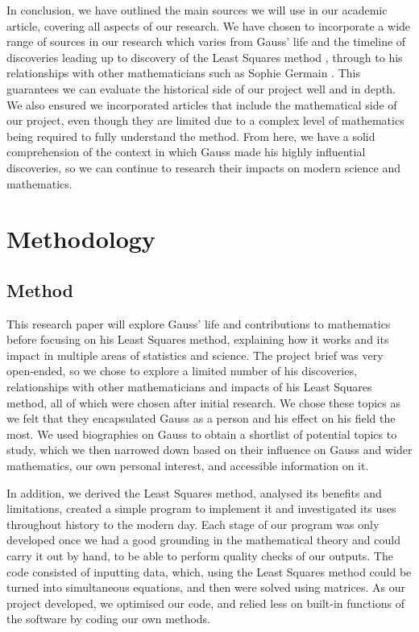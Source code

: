 \documentclass{article}
\begin{document}
In conclusion, we have outlined the main sources we will use in our academic article, covering all aspects of our research. We have chosen to incorporate a wide range of sources in our research which varies from Gauss' life and the timeline of discoveries leading up to discovery of the Least Squares method \cite{stigler}, through to his relationships with other mathematicians such as Sophie Germain \cite{germaincorrespondence}. This guarantees we can evaluate the historical side of our project well and in depth. We also ensured we incorporated articles that include the mathematical side of our project, even though they are limited due to a complex level of mathematics being required to fully understand the method. From here, we have a solid comprehension of the context in which Gauss made his highly influential discoveries, so we can continue to research their impacts on modern science and mathematics. 

\section{Methodology}
\subsection{Method}

This research paper will explore Gauss’ life and contributions to mathematics before focusing on his Least Squares method, explaining how it works and its impact in multiple areas of statistics and science. The project brief was very open-ended, so we chose to explore a limited number of his discoveries, relationships with other mathematicians and impacts of his Least Squares method, all of which were chosen after initial research. We chose these topics as we felt that they encapsulated Gauss as a person and his effect on his field the most. We used biographies on Gauss to obtain a shortlist of potential topics to study, which we then narrowed down based on their influence on Gauss and wider mathematics, our own personal interest, and accessible information on it.  

In addition, we derived the Least Squares method, analysed its benefits and limitations, created a simple program to implement it and investigated its uses throughout history to the modern day. Each stage of our program was only developed once we had a good grounding in the mathematical theory and could carry it out by hand, to be able to perform quality checks of our outputs. The code consisted of inputting data, which, using the Least Squares method could be turned into simultaneous equations, and then were solved using matrices. As our project developed, we optimised our code, and relied less on built-in functions of the software by coding our own methods. 
\end{document}
